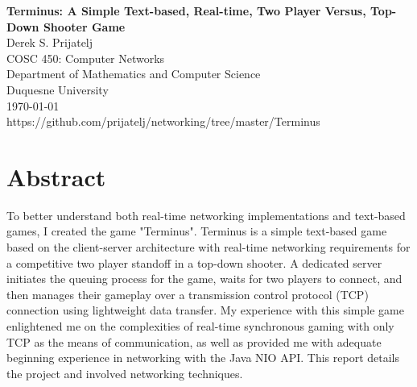 \documentclass[12pt]{article}
\begin{document}
\begin{titlepage}
\begin{center}
        \large
        \textbf{Terminus: A Simple Text-based, Real-time, Two Player Versus, Top-Down Shooter Game}\\
        \normalsize
        \vspace{0.5cm}
        Derek S. Prijatelj\\
        COSC 450: Computer Networks\\
        Department of Mathematics and Computer Science\\
        Duquesne University\\
        \today\\
        https://github.com/prijatelj/networking/tree/master/Terminus
    \end{center}
\section*{Abstract}
    To better understand both real-time networking implementations and text-based games, I created the game "Terminus". Terminus is a simple text-based game based on the client-server architecture with real-time networking requirements for a competitive two player standoff in a top-down shooter. A dedicated server initiates the queuing process for the game, waits for two players to connect, and then manages their gameplay over a transmission control protocol (TCP) connection using lightweight data transfer. My experience with this simple game enlightened me on the complexities of real-time synchronous gaming with only TCP as the means of communication, as well as provided me with adequate beginning experience in networking with the Java NIO API. This report details the project and involved networking techniques.

\end{titlepage}
\pagestyle{fancy}
\end{document}
